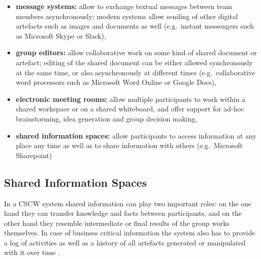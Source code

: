 \begin{itemize}
  \item \textbf{message systems:} allow to exchange textual messages between team members asynchronously; modern systems allow sending of other digital artefacts such as images and documents as well (e.g.\ instant messengers such as Microsoft Skype or Slack),
  \item \textbf{group editors:} allow collaborative work on some kind of shared document or artefact; editing of the shared document can be either allowed synchronously at the same time, or also asynchronously at different times (e.g.\ collaborative word processors such as Microsoft Word Online or Google Docs),
  \item \textbf{electronic meeting rooms:} allow multiple participants to work within a shared workspace or on a shared whiteboard, and offer support for ad-hoc brainstorming, idea generation and group decision making,
  \item \textbf{shared information spaces:} allow participants to access information at any place any time as well as to share information with others (e.g.\ Microsoft Sharepoint)
\end{itemize}


\subsection{Shared Information Spaces}
\label{sec:cscw_shared_spaces}

In a \gls{CSCW} system shared information can play two important roles: on the one hand they can transfer knowledge and facts between participants, and on the other hand they resemble intermediate or final results of the group works themselves. In case of business critical information the system also has to provide a log of activities as well as a history of all artefacts generated or manipulated with it over time \citep[pg. 295]{borghoff2000computer}. \\

